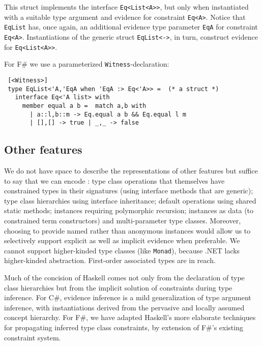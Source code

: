 \documentclass{elsarticle}
\newif\ifclassic
\begin{document}
This struct implements the interface \lstinline{Eq<List<A>>}, but only when instantiated with a suitable type argument and evidence for constraint \lstinline{Eq<A>}.
Notice that \lstinline{EqList} has, once again, an additional evidence type parameter  \lstinline{EqA} for constraint \lstinline{Eq<A>}.
Instantiations of the generic struct \lstinline{EqList<->}, in turn, construct evidence for \lstinline{Eq<List<A>>}.

\ifclassic
For F\# we adopt the more concise, nameless declaration:

\lstset{language={FSharp}}
\begin{lstlisting}
instance Eq 'a => Eq (List 'a) where 
  Equal(a,b) = match a,b with
    | (a::l),(b::m) -> Equal(a,b) && Equal(l,m)
    | [],[] -> true | _,_ -> false
\end{lstlisting}
\else
For F\# we use a parameterized \lstinline{Witness}-declaration:
\begin{lstlisting}
 [<Witness>] 
 type EqList<'A,'EqA when 'EqA :> Eq<'A>> =  (* a struct *)
   interface Eq<'A list> with
     member equal a b =  match a,b with
       | a::l,b::m -> Eq.equal a b && Eq.equal l m
       | [],[] -> true | _,_ -> false
\end{lstlisting}

\fi

\subsection{Other features}

We do not have space to describe the representations of other features but suffice to say that we can encode \cite{natural}:
type class operations that themselves have constrained types in their signatures (using interface methods that are generic);
type class hierarchies  using interface inheritance; default operations using shared static methods; instances requiring 
polymorphic recursion; instances as data (to constrained term constructors) and multi-parameter type classes. Moreover, choosing to provide named rather than anonymous instances would allow us to selectively support
explicit as well as implicit evidence when preferable. 
We cannot support  higher-kinded type classes (like \lstinline{Monad}), because .NET lacks higher-kinded abstraction.
First-order associated types are in reach.

Much of the concision of Haskell comes not only from the declaration of type class hierarchies but from the implicit solution of constraints during type inference.
For C\#, evidence inference is a mild generalization of type argument inference, with instantiations derived from the pervasive and locally assumed concept hierarchy.
For F\#, we have adapted Haskell's more elaborate techniques for propagating inferred type class constraints, by extension of F\#'s existing constraint system.
\end{document}
